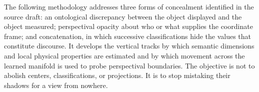 The following methodology addresses three forms of concealment identified in the source draft: an ontological discrepancy between the object displayed and the object measured; perspectival opacity about who or what supplies the coordinate frame; and concatenation, in which successive classifications hide the values that constitute discourse. It develops the vertical tracks by which semantic dimensions and local physical properties are estimated and by which movement across the learned manifold is used to probe perspectival boundaries. The objective is not to abolish centers, classifications, or projections. It is to stop mistaking their shadows for a view from nowhere.
